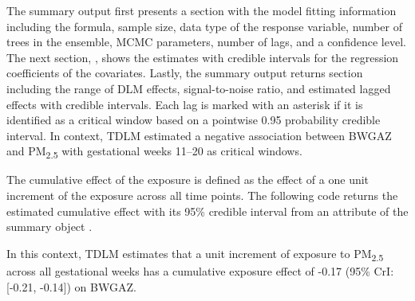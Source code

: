 The summary output first presents a section  with the model fitting information including the formula, sample size, data type of the response variable, number of trees in the ensemble, MCMC parameters, number of lags, and a confidence level. The next section, , shows the estimates with credible intervals for the regression coefficients of the covariates. Lastly, the summary output returns  section including the range of DLM effects, signal-to-noise ratio, and estimated lagged effects with credible intervals. Each lag is marked with an asterisk if it is identified as a critical window based on a pointwise 0.95 probability credible interval. In context, TDLM estimated a negative association between BWGAZ and PM\textsubscript{2.5} with gestational weeks 11--20 as critical windows.

The cumulative effect of the exposure is defined as the effect of a one unit increment of the exposure across all time points. The following code returns the estimated cumulative effect with its 95\% credible interval from an attribute  of the summary object .
In this context, TDLM estimates that a unit increment of exposure to PM\textsubscript{2.5} across all gestational weeks has a cumulative exposure effect of -0.17 (95\% CrI: [-0.21, -0.14]) on BWGAZ.


